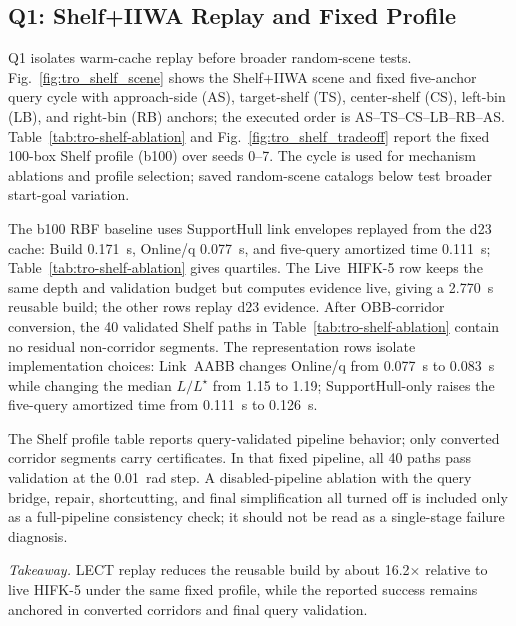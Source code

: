 \documentclass[journal]{IEEEtran}
\DeclareRobustCommand{\textsc}[1]{\textnormal{\MakeUppercase{#1}}}
\newcommand{\rbf}{\textsc{RBF}}
\newcommand{\onlineq}{\mbox{Online/q}}
\let\TableOrigTiny\tiny
\let\TableOrigScriptSize\scriptsize
\let\TableOrigFootnoteSize\footnotesize
\let\TableOrigSmall\small
\newcommand{\TableFontRestore}{%
  \let\tiny\TableOrigTiny
  \let\scriptsize\TableOrigScriptSize
  \let\footnotesize\TableOrigFootnoteSize
  \let\small\TableOrigSmall
}
\begin{document}
\begin{table}[!t]
  \centering
  \TableFontRestore
  
\end{table}

\subsection{Q1: Shelf+IIWA Replay and Fixed Profile}
\label{sec:exp_shelf_iiwa}

Q1 isolates warm-cache replay before broader random-scene tests. Fig.~\ref{fig:tro_shelf_scene}
shows the Shelf+IIWA scene and fixed five-anchor query cycle with approach-side
(AS), target-shelf (TS), center-shelf (CS), left-bin (LB), and right-bin (RB)
anchors; the executed order is AS--TS--CS--LB--RB--AS\@. Table~\ref{tab:tro-shelf-ablation}
and Fig.~\ref{fig:tro_shelf_tradeoff} report the fixed 100-box Shelf profile
(b100) over seeds 0--7. The cycle is used for mechanism ablations and profile
selection; saved random-scene catalogs below test broader start-goal variation.

The b100 \rbf{} baseline uses SupportHull link envelopes replayed from the d23
cache: Build 0.171~s, \onlineq{} 0.077~s, and five-query amortized time 0.111~s;
Table~\ref{tab:tro-shelf-ablation} gives quartiles. The \mbox{Live HIFK-5} row
keeps the same depth and validation budget but computes evidence live, giving a
2.770~s reusable build; the other rows replay d23 evidence.
After OBB-corridor conversion, the 40 validated Shelf paths in
Table~\ref{tab:tro-shelf-ablation} contain no residual non-corridor segments.
The representation rows isolate implementation choices: Link~AABB changes \onlineq{} from
0.077~s to 0.083~s while changing the median \(L/L^\star\) from 1.15 to 1.19;
\mbox{SupportHull-only} raises the five-query amortized time from 0.111~s to
0.126~s.

The Shelf profile table reports query-validated pipeline behavior; only
converted corridor segments carry certificates. In that fixed pipeline, all 40
paths pass validation at the 0.01~rad step. A disabled-pipeline ablation with
the query bridge, repair, shortcutting, and final simplification all turned off
is included only as a full-pipeline consistency check; it should not be read as
a single-stage failure diagnosis.

\noindent\emph{Takeaway.}
LECT replay reduces the reusable build by about 16.2$\times$ relative to live
\mbox{HIFK-5} under the same fixed profile, while the reported success remains
anchored in converted corridors and final query validation.
\end{document}
